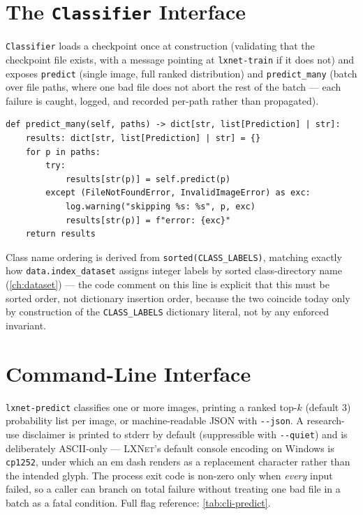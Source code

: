 \documentclass[11pt,a4paper,oneside]{report}
\newcommand{\LXNet}{\textsc{LXNet}}
\newcommand{\code}[1]{\texttt{\small #1}}
\begin{document}
\section{The \code{Classifier} Interface}

\code{Classifier} loads a checkpoint once at construction (validating that
the checkpoint file exists, with a message pointing at \code{lxnet-train}
if it does not) and exposes \code{predict} (single image, full ranked
distribution) and \code{predict\_many} (batch over file paths, where one bad
file does not abort the rest of the batch --- each failure is caught,
logged, and recorded per-path rather than propagated).

\begin{lstlisting}[caption={A batch of predictions is not aborted by one bad
file (\texttt{lxnet/predict.py}).}, label=lst:predictmany]
def predict_many(self, paths) -> dict[str, list[Prediction] | str]:
    results: dict[str, list[Prediction] | str] = {}
    for p in paths:
        try:
            results[str(p)] = self.predict(p)
        except (FileNotFoundError, InvalidImageError) as exc:
            log.warning("skipping %s: %s", p, exc)
            results[str(p)] = f"error: {exc}"
    return results
\end{lstlisting}

Class name ordering is derived from \code{sorted(CLASS\_LABELS)}, matching
exactly how \code{data.index\_dataset} assigns integer labels by sorted
class-directory name (\cref{ch:dataset}) --- the code comment on this line is
explicit that this must be sorted order, not dictionary insertion order,
because the two coincide today only by construction of the \code{CLASS\_LABELS}
dictionary literal, not by any enforced invariant.

\section{Command-Line Interface}

\code{lxnet-predict} classifies one or more images, printing a ranked
top-$k$ (default 3) probability list per image, or machine-readable JSON with
\code{-{}-json}. A research-use disclaimer is printed to stderr by default
(suppressible with \code{-{}-quiet}) and is deliberately ASCII-only ---
\LXNet{}'s default console encoding on Windows is \texttt{cp1252}, under
which an em dash renders as a replacement character rather than the intended
glyph. The process exit code is non-zero only when \emph{every} input failed,
so a caller can branch on total failure without treating one bad file in a
batch as a fatal condition. Full flag reference: \cref{tab:cli-predict}.
\end{document}

